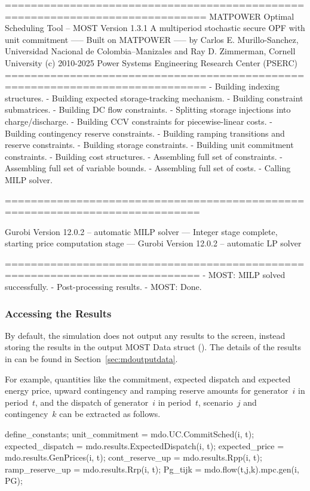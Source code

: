 \documentclass[12pt]{article}
\newcommand{\most}[0]{{MOST}}
\newcommand{\md}[0]{{\most{} Data struct}}
\newcommand{\code}[1]{{\relsize{-0.5}{\tt{{#1}}}}}  %
\numberwithin{equation}{section}
\numberwithin{table}{section}
\numberwithin{figure}{section}
\begin{document}
\begin{Code}
=============================================================================
          MATPOWER Optimal Scheduling Tool  --  MOST Version 1.3.1
          A multiperiod stochastic secure OPF with unit commitment
                       -----  Built on MATPOWER  -----
  by Carlos E. Murillo-Sanchez, Universidad Nacional de Colombia--Manizales
                  and Ray D. Zimmerman, Cornell University
       (c) 2010-2025 Power Systems Engineering Research Center (PSERC)       
=============================================================================
- Building indexing structures.
- Building expected storage-tracking mechanism.
- Building constraint submatrices.
  - Building DC flow constraints.
  - Splitting storage injections into charge/discharge.
  - Building CCV constraints for piecewise-linear costs.
  - Building contingency reserve constraints.
  - Building ramping transitions and reserve constraints.
  - Building storage constraints.
  - Building unit commitment constraints.
- Building cost structures.
- Assembling full set of constraints.
- Assembling full set of variable bounds.
- Assembling full set of costs.
- Calling MILP solver.

============================================================================

Gurobi Version 12.0.2 -- automatic MILP solver
--- Integer stage complete, starting price computation stage ---
Gurobi Version 12.0.2 -- automatic LP solver

============================================================================
- MOST: MILP solved successfully.
- Post-processing results.
- MOST: Done.
\end{Code}

\subsubsection{Accessing the Results}

By default, the simulation does not output any results to the screen, instead storing the results in the output \md{} (\code{mdo}).
The details of the results in \code{mdo} can be found in Section~\ref{sec:mdoutputdata}.

For example, quantities like the commitment, expected dispatch and expected energy price, upward contingency and ramping reserve amounts for generator~$i$ in period~$t$, and the dispatch of generator~$i$ in period~$t$, scenario~$j$ and contingency~$k$ can be extracted as follows.
\begin{Code}
define_constants;
unit_commitment     = mdo.UC.CommitSched(i, t);
expected_dispatch   = mdo.results.ExpectedDispatch(i, t);
expected_price      = mdo.results.GenPrices(i, t);
cont_reserve_up     = mdo.results.Rpp(i, t);
ramp_reserve_up     = mdo.results.Rrp(i, t);
Pg_tijk             = mdo.flow(t,j,k).mpc.gen(i, PG);
\end{Code}
\end{document}
